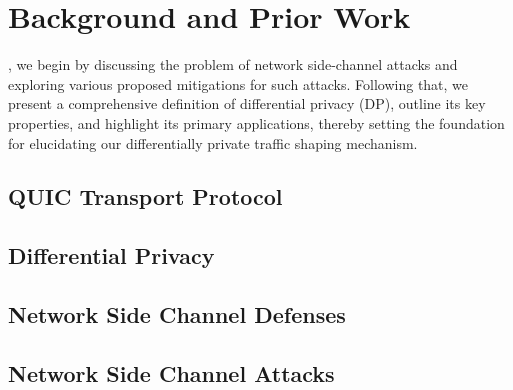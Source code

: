 \chapter{Background and Prior Work}\label{ch:background}
, we begin by discussing the problem of network side-channel attacks and exploring various proposed mitigations for such attacks. 
Following that, we present a comprehensive definition of differential privacy (DP), outline its key properties, and highlight its primary applications, thereby setting the foundation for elucidating our differentially private traffic shaping mechanism. 

\section{QUIC Transport Protocol}


\section{Differential Privacy}\label{sec:dp-background}


\section{Network Side Channel Defenses}\label{sec:ns-defenses}


\section{Network Side Channel Attacks}\label{sec:ns-attacks}




